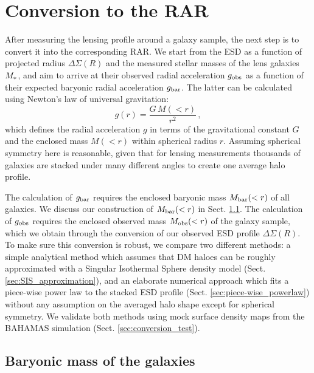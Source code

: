 \documentclass[usenatbib]{mnras}
\newcommand{\un}[1]{_{\rm #1}}
\begin{document}
\section{Conversion to the RAR}
\label{sec:conversion}

After measuring the lensing profile around a galaxy sample, the next step is to convert it into the corresponding RAR. We start from the ESD as a function of projected radius $\Delta\Sigma(R)$ and the measured stellar masses of the lens galaxies $M\un{*}$, and aim to arrive at their observed radial acceleration $g\un{obs}$ as a function of their expected baryonic radial acceleration $g\un{bar}$. The latter can be calculated using Newton's law of universal gravitation:
\begin{equation}\label{eq:grav}
g(r) = \frac{G \, M(<r)}{r^2} \, ,
\end{equation}
which defines the radial acceleration $g$ in terms of the gravitational constant $G$ and the enclosed mass $M(<r)$ within spherical radius $r$. Assuming spherical symmetry here is reasonable, given that for lensing measurements thousands of galaxies are stacked under many different angles to create one average halo profile. 

The calculation of $g\un{bar}$ requires the enclosed baryonic mass $M\un{bar}(<r)$ of all galaxies. We discuss our construction of $M\un{bar}(<r)$ in Sect. \ref{sec:baryonic_mass}. The calculation of $g\un{obs}$ requires the enclosed observed mass $M\un{obs}(<r)$ of the galaxy sample, which we obtain through the conversion of our observed ESD profile \mbox{$\Delta\Sigma(R)$}. To make sure this conversion is robust, we compare two different methods: a simple analytical method which assumes that DM haloes can be roughly approximated with a Singular Isothermal Sphere density model (Sect. \ref{sec:SIS_approximation}), and an elaborate numerical approach which fits a piece-wise power law to the stacked ESD profile (Sect. \ref{sec:piece-wise_powerlaw}) without any assumption on the averaged halo shape except for spherical symmetry. We validate both methods using mock surface density maps from the BAHAMAS simulation (Sect. \ref{sec:conversion_test}).

\subsection{Baryonic mass of the galaxies}
\label{sec:baryonic_mass}
\end{document}
